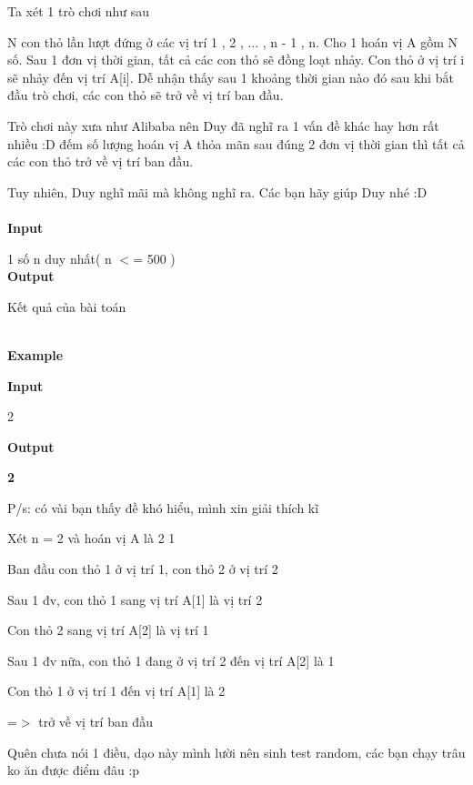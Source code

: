 



    Ta xét 1 trò chơi như sau   

    N con thỏ lần lượt đứng ở các vị trí 1 , 2 , ... , n - 1 , n. Cho 1 hoán vị A gồm N số. Sau 1 đơn vị thời gian, tất cả các con thỏ sẽ đồng loạt nhảy. Con thỏ ở vị trí i sẽ nhảy đến vị trí A[i]. Dễ nhận thấy sau 1 khoảng thời gian nào đó sau khi bắt đầu trò chơi, các con thỏ sẽ trở về vị trí ban đầu.   

    Trò chơi này xưa như Alibaba nên Duy đã nghĩ ra 1 vấn đề khác hay hơn rất nhiều :D đếm số lượng hoán vị A thỏa mãn sau đúng 2 đơn vị thời gian thì tất cả các con thỏ trở về vị trí ban đầu.   

    Tuy nhiên, Duy nghĩ mãi mà không nghĩ ra. Các bạn hãy giúp Duy nhé :D    
\\


\\

\textbf{     Input    }

    1 số n duy nhất( n $<$= 500 )    
\\

\textbf{     Output    }

    Kết quả của bài toán   


\\

\textbf{     Example    }

\textbf{     Input    }

    2   

\textbf{     Output    }

\textbf{     2    }



    P/s: có vài bạn thấy đề khó hiểu, mình xin giải thích kĩ   

    Xét n = 2 và hoán vị A là 2 1   

    Ban đầu con thỏ 1 ở vị trí 1, con thỏ 2 ở vị trí 2   

    Sau 1 đv, con thỏ 1 sang vị trí A[1] là vị trí 2   

    Con thỏ 2 sang vị trí A[2] là vị trí 1   

    Sau 1 đv nữa, con thỏ 1 đang ở vị trí 2 đến vị trí A[2] là 1   

    Con thỏ 1 ở vị trí 1 đến vị trí A[1] là 2   

    =$>$ trở về vị trí ban đầu   

    Quên chưa nói 1 điều, dạo này mình lười nên sinh test random, các bạn chạy trâu ko ăn được điểm đâu :p    
\\